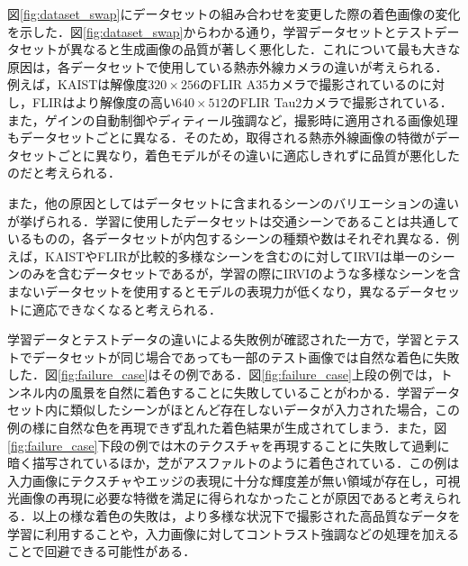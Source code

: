 \documentclass[11pt,dvipdfmx]{ujreport}
\begin{document}
図\ref{fig:dataset_swap}にデータセットの組み合わせを変更した際の着色画像の変化を示した．図\ref{fig:dataset_swap}からわかる通り，学習データセットとテストデータセットが異なると生成画像の品質が著しく悪化した．これについて最も大きな原因は，各データセットで使用している熱赤外線カメラの違いが考えられる．
例えば，KAISTは解像度$320\times256$のFLIR A35カメラで撮影されているのに対し，FLIRはより解像度の高い$640\times512$のFLIR Tau2カメラで撮影されている．また，ゲインの自動制御やディティール強調など，撮影時に適用される画像処理もデータセットごとに異なる．そのため，取得される熱赤外線画像の特徴がデータセットごとに異なり，着色モデルがその違いに適応しきれずに品質が悪化したのだと考えられる．\par
また，他の原因としてはデータセットに含まれるシーンのバリエーションの違いが挙げられる．学習に使用したデータセットは交通シーンであることは共通しているものの，各データセットが内包するシーンの種類や数はそれぞれ異なる．例えば，KAISTやFLIRが比較的多様なシーンを含むのに対してIRVIは単一のシーンのみを含むデータセットであるが，学習の際にIRVIのような多様なシーンを含まないデータセットを使用するとモデルの表現力が低くなり，異なるデータセットに適応できなくなると考えられる．\par

学習データとテストデータの違いによる失敗例が確認された一方で，学習とテストでデータセットが同じ場合であっても一部のテスト画像では自然な着色に失敗した．図\ref{fig:failure_case}はその例である．図\ref{fig:failure_case}上段の例では，トンネル内の風景を自然に着色することに失敗していることがわかる．学習データセット内に類似したシーンがほとんど存在しないデータが入力された場合，この例の様に自然な色を再現できず乱れた着色結果が生成されてしまう．また，図\ref{fig:failure_case}下段の例では木のテクスチャを再現することに失敗して過剰に暗く描写されているほか，芝がアスファルトのように着色されている．この例は入力画像にテクスチャやエッジの表現に十分な輝度差が無い領域が存在し，可視光画像の再現に必要な特徴を満足に得られなかったことが原因であると考えられる．以上の様な着色の失敗は，より多様な状況下で撮影された高品質なデータを学習に利用することや，入力画像に対してコントラスト強調などの処理を加えることで回避できる可能性がある．
\end{document}
